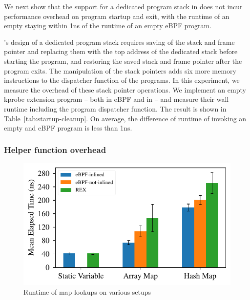 We next show that the support for a dedicated program stack in \projname{} does
    not incur performance overhead on program startup and exit, with the
    runtime of an empty \projname{} staying within 1ns of the runtime of an
    empty eBPF program.

\projname{}'s design of a dedicated program stack requires saving of the stack
    and frame pointer and replacing them
    with the top address of the dedicated stack before starting the program,
    and restoring the saved stack and frame pointer after the program exits.
The manipulation of the stack pointers adds six more memory instructions to
    the dispatcher function of the \projname{} programs.
In this experiment, we measure the overhead of these stack pointer operations.
We implement an empty kprobe extension program -- both in eBPF and in
    \projname{} -- and measure their wall runtime including the program
    dispatcher function.
The result is shown in Table~\ref{tab:startup-cleanup}.
On average, the difference of runtime of invoking an empty \projname{} and eBPF
    program is less than 1ns.
\subsubsection{Helper function overhead}
\label{eval:inline}

\begin{figure}[t]
    \includegraphics[width=1.0\linewidth]{figs/inline.pdf}
    \centering
    \vspace{-25pt}
    \caption{Runtime of map lookups on various setups}
    \label{fig:eval-inline}
    \vspace{-12pt}
\end{figure}

